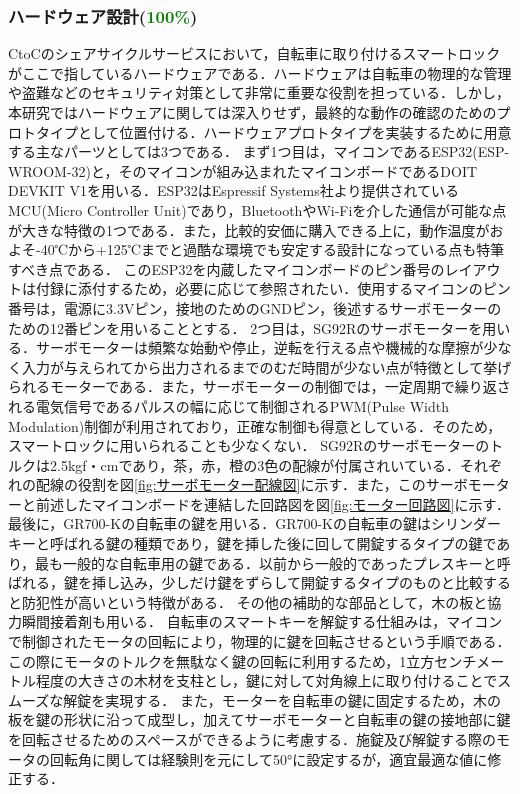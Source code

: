       \subsubsection{ハードウェア設計(\textcolor{green}{100\%})}
        \label{sec:ハードウェア設計}
          \par CtoCのシェアサイクルサービスにおいて，自転車に取り付けるスマートロックがここで指しているハードウェアである．ハードウェアは自転車の物理的な管理や盗難などのセキュリティ対策として非常に重要な役割を担っている．しかし，本研究ではハードウェアに関しては深入りせず，最終的な動作の確認のためのプロトタイプとして位置付ける．ハードウェアプロトタイプを実装するために用意する主なパーツとしては3つである．
          まず1つ目は，マイコンであるESP32(ESP-WROOM-32)と，そのマイコンが組み込まれたマイコンボードであるDOIT DEVKIT V1を用いる．ESP32はEspressif Systems社より提供されているMCU(Micro Controller Unit)であり，BluetoothやWi-Fiを介した通信が可能な点が大きな特徴の1つである．また，比較的安価に購入できる上に，動作温度がおよそ-40℃から+125℃までと過酷な環境でも安定する設計になっている点も特筆すべき点である．
          このESP32を内蔵したマイコンボードのピン番号のレイアウトは付録に添付するため，必要に応じて参照されたい．使用するマイコンのピン番号は，電源に3.3Vピン，接地のためのGNDピン，後述するサーボモーターのための12番ピンを用いることとする．
          2つ目は，SG92Rのサーボモーターを用いる．サーボモーターは頻繁な始動や停止，逆転を行える点や機械的な摩擦が少なく入力が与えられてから出力されるまでのむだ時間が少ない点が特徴として挙げられるモーターである．また，サーボモーターの制御では，一定周期で繰り返される電気信号であるパルスの幅に応じて制御されるPWM(Pulse Width Modulation)制御が利用されており，正確な制御も得意としている．そのため，スマートロックに用いられることも少なくない．
           SG92Rのサーボモーターのトルクは2.5kgf・cmであり，茶，赤，橙の3色の配線が付属されいている．それぞれの配線の役割を図\ref{fig:サーボモーター配線図}に示す．また，このサーボモーターと前述したマイコンボードを連結した回路図を図\ref{fig:モーター回路図}に示す．
           最後に，GR700-Kの自転車の鍵を用いる．GR700-Kの自転車の鍵はシリンダーキーと呼ばれる鍵の種類であり，鍵を挿した後に回して開錠するタイプの鍵であり，最も一般的な自転車用の鍵である．以前から一般的であったプレスキーと呼ばれる，鍵を挿し込み，少しだけ鍵をずらして開錠するタイプのものと比較すると防犯性が高いという特徴がある．
           その他の補助的な部品として，木の板と協力瞬間接着剤も用いる．
           自転車のスマートキーを解錠する仕組みは，マイコンで制御されたモータの回転により，物理的に鍵を回転させるという手順である．この際にモータのトルクを無駄なく鍵の回転に利用するため，1立方センチメートル程度の大きさの木材を支柱とし，鍵に対して対角線上に取り付けることでスムーズな解錠を実現する．
           また，モーターを自転車の鍵に固定するため，木の板を鍵の形状に沿って成型し，加えてサーボモーターと自転車の鍵の接地部に鍵を回転させるためのスペースができるように考慮する．施錠及び解錠する際のモータの回転角に関しては経験則を元にして50°に設定するが，適宜最適な値に修正する．

